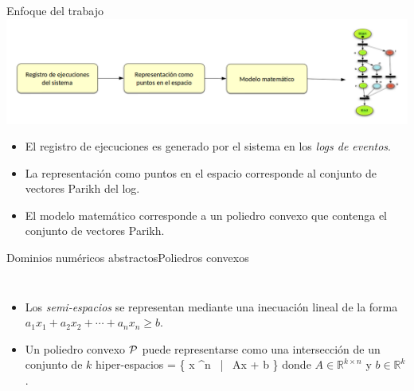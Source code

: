 \documentclass[spanish,pdf]{beamer}
\begin{document}
\begin{frame}{Enfoque del trabajo}{}
  \centering
  \includegraphics[width=1.0\linewidth]{img/approach_simplificado.png}
  \begin{itemize}
    \setlength\itemsep{0.2cm}
    \item<1-> El registro de ejecuciones es generado por el sistema en los \textit{logs de eventos}.
    \item<1-> La representación como puntos en el espacio corresponde al conjunto de vectores Parikh del log.
    \item<2-> El modelo matemático corresponde a un poliedro convexo que contenga el conjunto de vectores Parikh.
  \end{itemize}
\end{frame}
\begin{frame}{Dominios numéricos abstractos}{Poliedros convexos}
  \begin{columns}


      \begin{itemize}
        \scriptsize
        \setlength\itemsep{0.2cm}
        \item<2-> Los \textit{semi-espacios} se representan mediante una inecuación lineal de la forma $a_1x_1 + a_2x_2 + \cdots + a_nx_n \geq b.$
        \item<3-> Un poliedro convexo ${\mathcal P}$ puede representarse como una intersección de un conjunto de $k$ hiper-espacios
            \bnnequation
                \ph = \{ x \in {}^n ~|~ A\cdot x + b \}
            \ennequation
            donde  \mbox{$A \in \mathbb{R}^{k \times n}$} y \mbox{$b\in\mathbb{R}^{k}$}.
      \end{itemize}

  \end{columns}
\end{frame}
\end{document}
